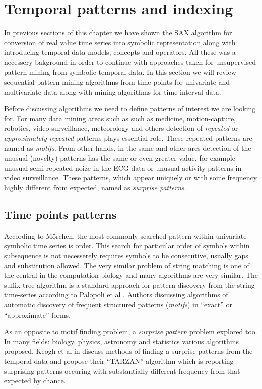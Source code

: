 \section{Temporal patterns and indexing} \label{tpatterns}
In previous sections of this chapter we have shown the SAX algorithm for conversion of real value time series into symbolic representation along with introducing temporal data models, concepts and operators. All these was a necessery bakground in order to continue with approaches taken for unsupervised pattern mining from symbolic temporal data. In this section we will review sequential pattern mining algorithms from time points for univariate and multivariate data along with mining algorithms for time interval data.

Before discussing algorithms we need to define patterns of interest we are looking for. For many data mining areas such as such as medicine, motion-capture, robotics, video surveillance, meteorology and others detection of \textit{repeated} or \textit{approximately repeated} patterns plays essential role. These repeated patterns are named as \textit{motifs}. From other hands, in the same and other ares detection of the unusual (novelty) patterns has the same or even greater value, for example unusual semi-repeated noize in the ECG data or unusual activity patterns in video surveillance. These patterns, which appear uniquely or with some frequency highly different from expected, named as \textit{surprise patterns}.


\subsection{Time points patterns}
According to M\"orchen, the most commonly searched pattern within univariate symbolic time series is order. This search for particular order of symbols within subsequence is not necesserely requires symbols to be consecutive, usually gaps and substitution allowed. The very similar problem of string matching is one of the central in the computation biology \cite{citeulike:465665} and many algorithms are very similar. The suffix tree algorithm is a standard approach for pattern discovery from the string time-series according to Palopoli et al \cite{citeulike:5003338}. Authors discussing algorithms of automatic discovery of frequent structured patterns (\textit{motifs}) in ``exact'' or ``approximate'' forms. 

As an opposite to motif finding problem, a \textit{surprise pattern} problem explored too. In many fields: biology, physics, astronomy and statistics various algorithms proposed. Keogh et al in \cite{citeulike:3025877} discuss methods of finding a surprise patterns from the temporal data and propose their ``TARZAN'' algorithm which is reporting surprising patterns occuring with substantially different frequency from that expected by chance.